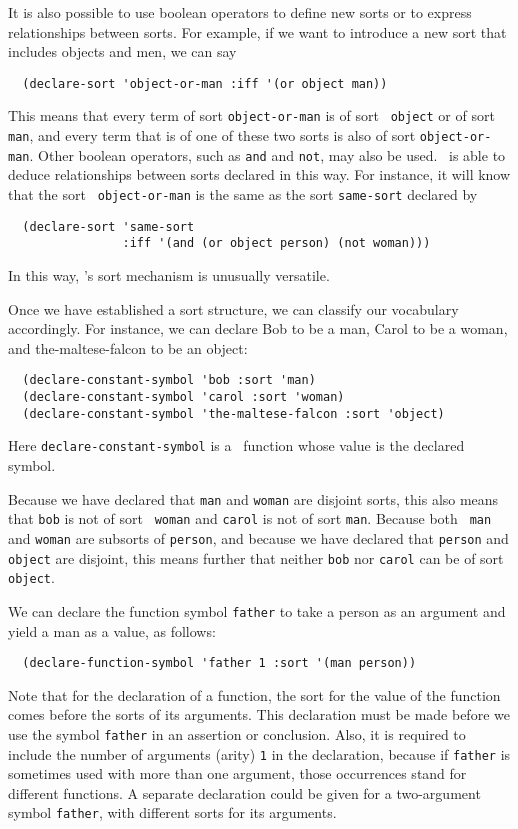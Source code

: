 It is also possible to use boolean operators to define new sorts or to
express relationships between sorts.  For example, if we want to
introduce a new sort that includes objects and men, we can say
\begin{verbatim}
  (declare-sort 'object-or-man :iff '(or object man))
\end{verbatim}
This means that every term of sort {\tt object-or-man} is of sort {\tt
object} or of sort {\tt man}, and every term that is of one of these
two sorts is also of sort {\tt object-or-man}.
Other boolean operators, such as {\tt and} and {\tt not}, may also be
used.  \Snark\  is able to deduce relationships between sorts declared
in this way.  For instance, it will know that the sort {\tt
object-or-man} is the same as the sort {\tt same-sort} declared by
\begin{verbatim}
  (declare-sort 'same-sort
                :iff '(and (or object person) (not woman)))
\end{verbatim}
In this way, \snark\/'s sort mechanism is unusually versatile.

Once we have established a sort structure, we can classify our
vocabulary accordingly.  For instance, we can declare Bob to be a man,
Carol to be a woman, and the-maltese-falcon to be an object:
\begin{verbatim}
  (declare-constant-symbol 'bob :sort 'man)
  (declare-constant-symbol 'carol :sort 'woman)
  (declare-constant-symbol 'the-maltese-falcon :sort 'object)
\end{verbatim}
Here {\tt declare-constant-symbol} is a \lisp\  function whose
value is the declared symbol.

Because we have declared that {\tt man} and {\tt woman} are
disjoint sorts, this also means that {\tt bob} is not of sort {\tt
woman} and {\tt carol} is not of sort {\tt man}.  Because both {\tt
man} and {\tt woman} are subsorts of {\tt person}, and because we have
declared that {\tt person} and {\tt object} are disjoint, this means
further that neither {\tt bob} nor {\tt carol} can be of sort {\tt
object}.

We can declare the function symbol {\tt father} to take a person as an
argument and yield a man as a value, as follows:
\begin{verbatim}
  (declare-function-symbol 'father 1 :sort '(man person))
\end{verbatim}
Note that for the declaration of a function, the sort for the value of the
function comes before the sorts of its arguments.  This declaration must be
made before we use the symbol {\tt father} in an assertion or conclusion.
Also, it is required to include the number of arguments (arity) {\tt 1} in
the declaration, because if {\tt father} is sometimes used with more than one
argument, those occurrences stand for different functions.  A separate
declaration could be given for a two-argument symbol {\tt father}, with
different sorts for its arguments.

